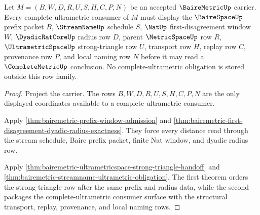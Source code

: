 \begin{theorem}
\label{thm:bairemetric-complete-ultrametric-consumer-obligations}
Let $M=(B,W,D,R,U,S,H,C,P,N)$ be an accepted $\BaireMetricUp$ carrier. Every complete ultrametric consumer of $M$ must display the $\BaireSpaceUp$ prefix packet $B$, $\StreamNameUp$ schedule $S$, $\NatUp$ first-disagreement window $W$, $\DyadicRatCoreUp$ radius row $D$, parent $\MetricSpaceUp$ row $R$, $\UltrametricSpaceUp$ strong-triangle row $U$, transport row $H$, replay row $C$, provenance row $P$, and local naming row $N$ before it may read a $\CompleteMetricUp$ conclusion. No complete-ultrametric obligation is stored outside this row family.
\end{theorem}
\begin{proof}
Project the carrier. The rows $B,W,D,R,U,S,H,C,P,N$ are the only displayed coordinates available to a complete-ultrametric consumer.

Apply \autoref{thm:bairemetric-prefix-window-admission} and \autoref{thm:bairemetric-first-disagreement-dyadic-radius-exactness}. They force every distance read through the stream schedule, Baire prefix packet, finite Nat window, and dyadic radius row.

Apply \autoref{thm:bairemetric-ultrametricspace-strong-triangle-handoff} and \autoref{thm:bairemetric-streamname-ultrametric-obligation}. The first theorem orders the strong-triangle row after the same prefix and radius data, while the second packages the complete-ultrametric consumer surface with the structural transport, replay, provenance, and local naming rows.
\end{proof}

